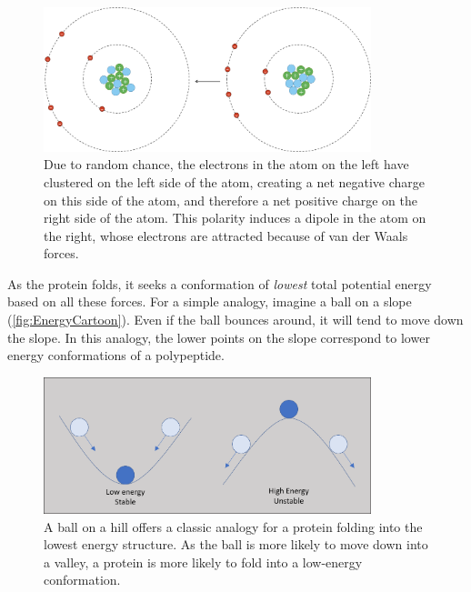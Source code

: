 \begin{figure}[h]
	\centering
	\mySfFamily
	\includegraphics[width = 0.85\textwidth]{../images/van_der_waals.png}
	\caption{Due to random chance, the electrons in the atom on the left have clustered on the left side of the atom, creating a net negative charge on this side of the atom, and therefore a net positive charge on the right side of the atom. This polarity induces a dipole in the atom on the right, whose electrons are attracted because of van der Waals forces.}
	\label{fig:van_der_waals}
\end{figure}

As the protein folds, it seeks a conformation of \textit{lowest} total potential energy based on all these forces. For a simple analogy, imagine a ball on a slope (\autoref{fig:EnergyCartoon}). Even if the ball bounces around, it will tend to move down the slope. In this analogy, the lower points on the slope correspond to lower energy conformations of a polypeptide.\\

\begin{figure}[h]
	\centering
	\mySfFamily
	\includegraphics[width = 0.85\textwidth]{../images/EnergyCartoon.png}
	\caption{A ball on a hill offers a classic analogy for a protein folding into the lowest energy structure. As the ball is more likely to move down into a valley, a protein is more likely to fold into a low-energy conformation.}
	\label{fig:EnergyCartoon}
\end{figure}

\FloatBarrier
{}
